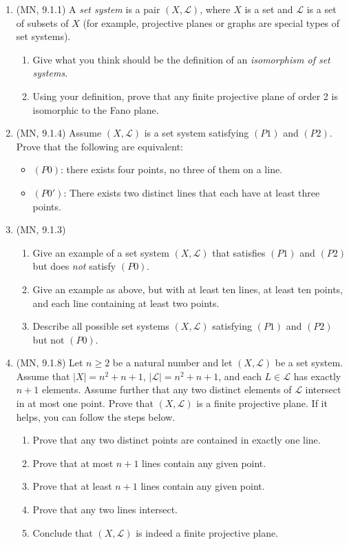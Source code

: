 \documentclass{amsart}
\theoremstyle{definition}
\newcommand{\Ls}{\mathcal{L}}
\begin{document}
\begin{enumerate}
\item (MN, 9.1.1) A \emph{set system} is a pair $(X, \Ls)$, where $X$ is a set and $\Ls$ is a set of subsets of $X$ (for example, projective planes or graphs are special types of set systems).
  \begin{enumerate}
  \item Give what you think should be the definition of an \emph{isomorphism of set systems}.
  \item Using your definition, prove that any finite projective plane of order 2 is isomorphic to the Fano plane.
  \end{enumerate}
\item (MN, 9.1.4) Assume $(X, \Ls)$ is a set system satisfying $(P1)$ and $(P2)$. Prove that the following are equivalent:
  \begin{itemize}
  \item $(P0)$: there exists four points, no three of them on a line.
  \item $(P0')$: There exists two distinct lines that each have at least three points.
  \end{itemize}
\item (MN, 9.1.3)
  \begin{enumerate}
  \item Give an example of a set system $(X, \Ls)$ that satisfies $(P1)$ and $(P2)$ but does \emph{not} satisfy $(P0)$.
  \item Give an example as above, but with at least ten lines, at least ten points, and each line containing at least two points.
  \item Describe all possible set systems $(X, \Ls)$ satisfying $(P1)$ and $(P2)$ but not $(P0)$.
  \end{enumerate}

\item (MN, 9.1.8)
  Let $n \ge 2$ be a natural number and let $(X, \Ls)$ be a set system. Assume that $|X| = n^2 + n +1$, $|\Ls| = n^2 + n + 1$, and each $L \in \Ls$ has exactly $n + 1$ elements. Assume further that any two distinct elements of $\Ls$ intersect in at most one point. Prove that $(X, \Ls)$ is a finite projective plane. If it helps, you can follow the steps below.
  
  \begin{enumerate}
  \item Prove that any two distinct points are contained in exactly one line. 
  \item Prove that at most $n + 1$ lines contain any given point.
  \item Prove that at least $n + 1$ lines contain any given point.
  \item Prove that any two lines intersect.
  \item Conclude that $(X, \Ls)$ is indeed a finite projective plane.  
  \end{enumerate}


\end{enumerate}
\end{document}
